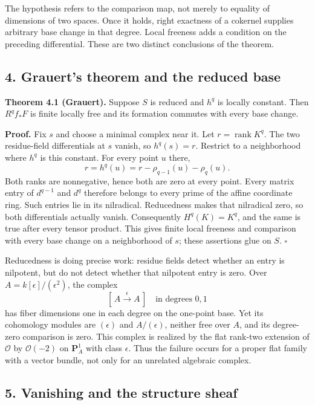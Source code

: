 \documentclass[11pt]{article}
\begin{document}
The hypothesis refers to the comparison map, not merely to equality of
dimensions of two spaces. Once it holds, right exactness of a cokernel
supplies arbitrary base change in that degree. Local freeness adds a
condition on the preceding differential. These are two distinct
conclusions of the theorem.

\subsection{4. Grauert's theorem and the reduced
base}\label{grauerts-theorem-and-the-reduced-base}

\textbf{Theorem 4.1 (Grauert).} Suppose \(S\) is reduced and \(h^q\) is
locally constant. Then \(R^qf_*F\) is finite locally free and its
formation commutes with every base change.

\textbf{Proof.} Fix \(s\) and choose a minimal complex near it. Let
\(r=\operatorname{rank}K^q\). The two residue-field differentials at
\(s\) vanish, so \(h^q(s)=r\). Restrict to a neighborhood where \(h^q\)
is this constant. For every point \(u\) there, \[
r=h^q(u)=r-\rho_{q-1}(u)-\rho_q(u).
\] Both ranks are nonnegative, hence both are zero at every point. Every
matrix entry of \(d^{q-1}\) and \(d^q\) therefore belongs to every prime
of the affine coordinate ring. Such entries lie in its nilradical.
Reducedness makes that nilradical zero, so both differentials actually
vanish. Consequently \(H^q(K)=K^q\), and the same is true after every
tensor product. This gives finite local freeness and comparison with
every base change on a neighborhood of \(s\); these assertions glue on
\(S\). \(\square\)

Reducedness is doing precise work: residue fields detect whether an
entry is nilpotent, but do not detect whether that nilpotent entry is
zero. Over \(A=k[\epsilon]/(\epsilon^2)\), the complex \[
[\,A\xrightarrow{\epsilon}A\,]\quad\text{in degrees }0,1
\] has fiber dimensions one in each degree on the one-point base. Yet
its cohomology modules are \((\epsilon)\) and \(A/(\epsilon)\), neither
free over \(A\), and its degree-zero comparison is zero. This complex is
realized by the flat rank-two extension of \(\mathcal O\) by
\(\mathcal O(-2)\) on \(\mathbf P^1_A\) with class \(\epsilon\). Thus
the failure occurs for a proper flat family with a vector bundle, not
only for an unrelated algebraic complex.

\subsection{5. Vanishing and the structure
sheaf}\label{vanishing-and-the-structure-sheaf}
\end{document}
